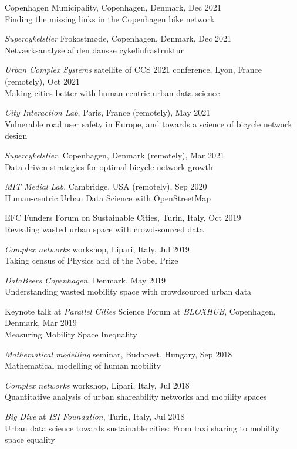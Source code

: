 \documentclass[10pt,a4paper]{article}
\renewenvironment{itemize}{
  \begin{list}{}{
    \setlength{\leftmargin}{1.5em}
    \setlength{\itemsep}{0.25em}
    \setlength{\parskip}{0pt}
    \setlength{\parsep}{0.25em}
  }
}{
  \end{list}
}
\begin{document}
\begin{itemize}
\item{Copenhagen Municipality, Copenhagen, Denmark, Dec 2021\\Finding the missing links in the Copenhagen bike network}
\item{\emph{Supercykelstier} Frokostmøde, Copenhagen, Denmark, Dec 2021\\Netværksanalyse af den danske cykelinfrastruktur}
\item{\emph{Urban Complex Systems} satellite of CCS 2021 conference, Lyon, France (remotely), Oct 2021\\Making cities better with human-centric urban data science}
\item{\emph{City Interaction Lab}, Paris, France (remotely), May 2021\\Vulnerable road user safety in Europe, and towards a science of bicycle network design}
\item{\emph{Supercykelstier}, Copenhagen, Denmark (remotely), Mar 2021\\Data-driven strategies for optimal bicycle network growth}
\item{\emph{MIT Medial Lab}, Cambridge, USA (remotely), Sep 2020\\Human-centric Urban Data Science with OpenStreetMap}
\item{EFC Funders Forum on Sustainable Cities, Turin, Italy, Oct 2019\\Revealing wasted urban space with crowd-sourced data}
\item{\emph{Complex networks} workshop, Lipari, Italy, Jul 2019\\Taking census of Physics and of the Nobel Prize}
\item{\emph{DataBeers Copenhagen}, Denmark, May 2019\\Understanding wasted mobility space with crowdsourced urban data}
\item{Keynote talk at \emph{Parallel Cities} Science Forum at \emph{BLOXHUB}, Copenhagen, Denmark, Mar 2019\\Measuring Mobility Space Inequality}
\item{\emph{Mathematical modelling} seminar, Budapest, Hungary, Sep 2018\\Mathematical modelling of human mobility}
\item{\emph{Complex networks} workshop, Lipari, Italy, Jul 2018\\Quantitative analysis of urban shareability networks and mobility spaces}
\item{\emph{Big Dive} at \emph{ISI Foundation}, Turin, Italy, Jul 2018\\Urban data science towards sustainable cities: From taxi sharing to mobility space equality}

\end{itemize}
\end{document}
